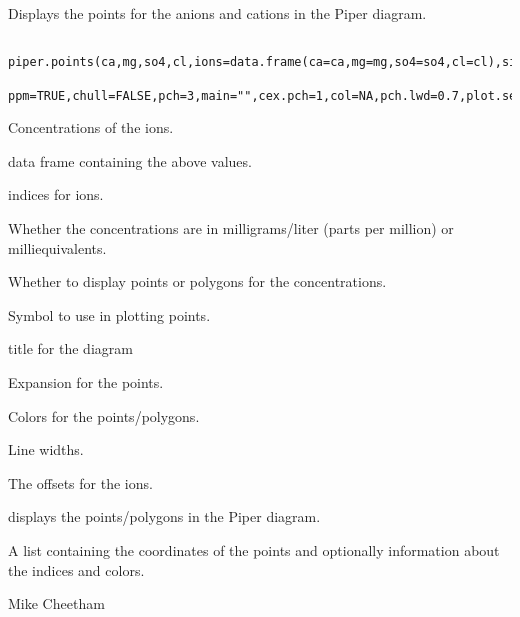 \begin{Description}\relax
Displays the points for the anions and cations in the Piper
diagram.
\end{Description}
\begin{Usage}
\begin{verbatim}
 piper.points(ca,mg,so4,cl,ions=data.frame(ca=ca,mg=mg,so4=so4,cl=cl),sites,
  ppm=TRUE,chull=FALSE,pch=3,main="",cex.pch=1,col=NA,pch.lwd=0.7,plot.sep=0.15)
\end{verbatim}
\end{Usage}
\begin{Arguments}
\begin{ldescription}
\item[\code{ca,mg,so4,cl}] Concentrations of the ions.
\item[\code{ions}] data frame containing the above values.
\item[\code{sites}] indices for ions.
\item[\code{ppm}] Whether the concentrations are in milligrams/liter (parts per
million) or milliequivalents.
\item[\code{chull}] Whether to display points or polygons for the concentrations.
\item[\code{pch}] Symbol to use in plotting points.
\item[\code{main}] title for the diagram
\item[\code{cex.pch}] Expansion for the points.
\item[\code{col}] Colors for the points/polygons.
\item[\code{pch.lwd}] Line widths.
\item[\code{plot.sep}] The offsets for the ions.
\end{ldescription}
\end{Arguments}
\begin{Details}\relax
{} displays the points/polygons in the Piper diagram.
\end{Details}
\begin{Value}
A list containing the coordinates of the points and optionally
information about the indices and colors.
\end{Value}
\begin{Author}\relax
Mike Cheetham
\end{Author}
\begin{SeeAlso}\relax
{}
\end{SeeAlso}

